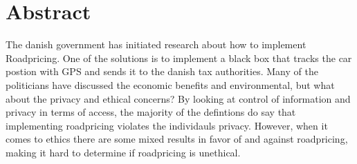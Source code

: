 \section*{Abstract}
The danish government has initiated research about how to implement Roadpricing. One of the solutions is to implement a black box that tracks the car postion with GPS and sends it to the danish tax authorities. Many of the politicians have discussed the economic benefits and environmental, but what about the privacy and ethical concerns? By looking at control of information and privacy in terms of access, the majority of the defintions do say that implementing roadpricing violates the individauls privacy. However, when it comes to ethics there are some mixed results in favor of and against roadpricing, making it hard to determine if roadpricing is unethical.